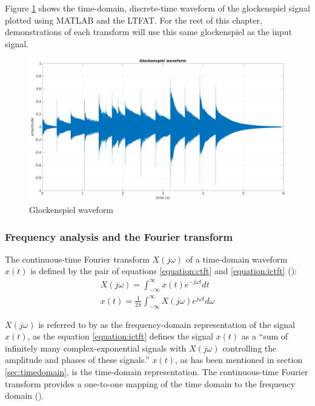 \documentclass[report.tex]{subfiles}
\begin{document}
Figure \ref{fig:glockwaveform} shows the time-domain, discrete-time waveform of the glockenspiel signal plotted using MATLAB and the LTFAT. For the rest of this chapter, demonstrations of each transform will use this same glockenspiel as the input signal.

\begin{figure}[ht]
	\centering
	\includegraphics[width=\textwidth]{./images-gspi/gspi_time_domain.png}
	\caption{Glockenspiel waveform}
	\label{fig:glockwaveform}
\end{figure}

\vfill
\clearpage

\subsubsection{Frequency analysis and the Fourier transform}

The continuous-time Fourier transform $X(j\omega)$ of a time-domain waveform $x(t)$ is defined by the pair of equations \ref{equation:ctft} and \ref{equation:ictft} (\cite[Chapter~11]{dspfirst}):
\begin{align}
	X(j\omega) = \int_{-\infty}^{\infty}{x(t)e^{-j\omega t}\mathit{dt}} \tag{1}\label{equation:ctft} \\
	x(t) = \frac{1}{2\pi}\int_{-\infty}^{\infty}{X(j\omega)e^{j\omega t}\mathit{d\omega}} \tag{2}\label{equation:ictft}
\end{align}

$X(j\omega)$ is referred to by \textcite{dspfirst} as the frequency-domain representation of the signal $x(t)$, as the equation \ref{equation:ictft} defines the signal $x(t)$ as a ``sum of infinitely many complex-exponential signals with $X(j\omega)$ controlling the amplitude and phases of these signals.'' $x(t)$, as has been mentioned in section \ref{sec:timedomain}, is the time-domain representation. The continuous-time Fourier transform provides a one-to-one mapping of the time domain to the frequency domain (\cite{dspfirst}).
\end{document}
